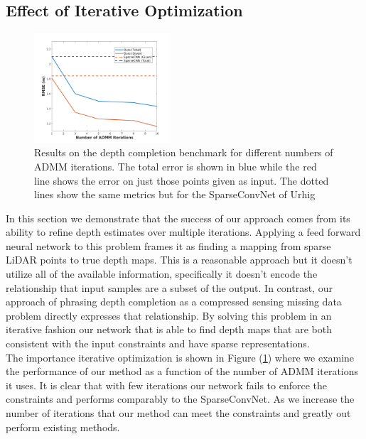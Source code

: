\subsection{Effect of Iterative Optimization}
\label{sec:effect-iter-optim}
\begin{figure}
  \centering
  \includegraphics[width=0.45\textwidth]{iterplot}
  \caption{Results on the depth completion benchmark for different numbers of ADMM iterations. The total error is shown in blue while the red line shows the error on just those points given as input. The dotted lines show the same metrics but for the SparseConvNet of Urhig \etal}
  \label{fig:iterplot}
\end{figure}

In this section we demonstrate that the success of our approach comes from its ability to refine depth estimates over multiple iterations. Applying a feed forward neural network to this problem frames it as finding a mapping from sparse LiDAR points to true depth maps. This is a reasonable approach but it doesn't utilize all of the available information, specifically it doesn't encode the relationship that input samples are a subset of the output. In contrast, our approach of phrasing depth completion as a compressed sensing missing data problem directly expresses that relationship. By solving this problem in an iterative fashion our network that is able to find depth maps that are both consistent with the input constraints and have sparse representations.\\

The importance iterative optimization is shown in Figure (\ref{fig:iterplot}) where we examine the performance of our method as a function of the number of ADMM iterations it uses. It is clear that with few iterations our network fails to enforce the constraints and performs comparably to the SparseConvNet. As we increase the number of iterations that our method can meet the constraints and greatly out perform existing methods.



